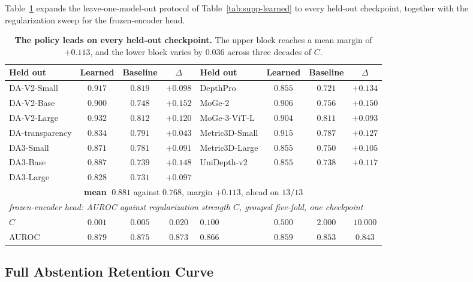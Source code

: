 \documentclass{article} %
\theoremstyle{defstyle}
\theoremstyle{plain}
\begin{document}
Table~\ref{tab:supp-lomo} expands the leave-one-model-out protocol of
Table~\ref{tab:supp-learned} to every held-out checkpoint, together with the regularization
sweep for the frozen-encoder head.

\begin{table}[!ht]
\caption{\textbf{The policy leads on every held-out checkpoint.} The upper block reaches a mean margin
of $+0.113$, and the lower block varies by $0.036$ across three decades of $C$.}
\label{tab:supp-lomo}
\begin{center}
\footnotesize
\begin{tabular}{lccc|lccc}
\toprule
\textbf{Held out} & \textbf{Learned} & \textbf{Baseline} & \textbf{$\Delta$} &
\textbf{Held out} & \textbf{Learned} & \textbf{Baseline} & \textbf{$\Delta$} \\
\midrule
DA-V2-Small     & $0.917$ & $0.819$ & $+0.098$ & DepthPro       & $0.855$ & $0.721$ & $+0.134$ \\
DA-V2-Base      & $0.900$ & $0.748$ & $+0.152$ & MoGe-2         & $0.906$ & $0.756$ & $+0.150$ \\
DA-V2-Large     & $0.932$ & $0.812$ & $+0.120$ & MoGe-3-ViT-L   & $0.904$ & $0.811$ & $+0.093$ \\
DA-transparency & $0.834$ & $0.791$ & $+0.043$ & Metric3D-Small & $0.915$ & $0.787$ & $+0.127$ \\
DA3-Small       & $0.871$ & $0.781$ & $+0.091$ & Metric3D-Large & $0.855$ & $0.750$ & $+0.105$ \\
DA3-Base        & $0.887$ & $0.739$ & $+0.148$ & UniDepth-v2    & $0.855$ & $0.738$ & $+0.117$ \\
DA3-Large       & $0.828$ & $0.731$ & $+0.097$ & & &  \\
\midrule
\multicolumn{8}{c}{\textbf{mean} $\;0.881$ against $0.768$, margin $+0.113$, ahead on $13/13$} \\
\midrule
\multicolumn{8}{l}{\emph{frozen-encoder head: AUROC against regularization strength $C$, grouped five-fold, one checkpoint}} \\
$C$ & $0.001$ & $0.005$ & $0.020$ & $0.100$ & $0.500$ & $2.000$ & $10.000$ \\
AUROC & $\mathbf{0.879}$ & $0.875$ & $0.873$ & $0.866$ & $0.859$ & $0.853$ & $0.843$ \\
\bottomrule
\end{tabular}
\end{center}
\end{table}

\subsection{Full Abstention Retention Curve}
\label{sec:supp-operating}
\end{document}
